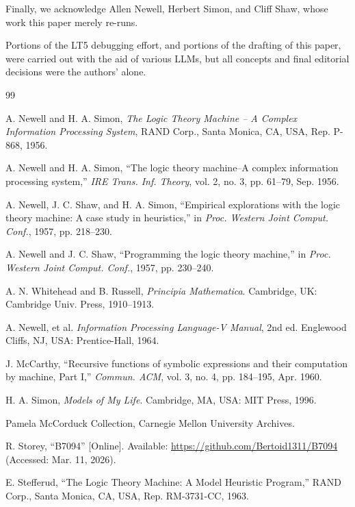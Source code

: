 \documentclass[journal]{IEEEtran}
\begin{document}
Finally, we acknowledge Allen Newell, Herbert Simon, and Cliff Shaw,
whose work this paper merely re-runs.

{\footnotesize Portions of the LT5 debugging effort, and portions of
the drafting of this paper, were carried out with the aid of various
LLMs, but all concepts and final editorial decisions were the
authors' alone.}

\begin{thebibliography}{99}

 A. Newell and H. A. Simon, \textit{The Logic Theory
  Machine -- A Complex Information Processing System}, RAND Corp.,
  Santa Monica, CA, USA, Rep. P-868, 1956.

 A. Newell and H. A. Simon, ``The logic theory
  machine--A complex information processing system,'' \textit{IRE
  Trans. Inf. Theory}, vol. 2, no. 3, pp. 61--79, Sep. 1956.

 A. Newell, J. C. Shaw, and H. A. Simon, ``Empirical
  explorations with the logic theory machine: A case study in
  heuristics,'' in \textit{Proc. Western Joint Comput. Conf.}, 1957,
  pp. 218--230.

 A. Newell and J. C. Shaw, ``Programming the
  logic theory machine,'' in \textit{Proc. Western Joint
  Comput. Conf.}, 1957, pp. 230--240.

 A. N. Whitehead and B. Russell,
  \textit{Principia Mathematica}. Cambridge, UK: Cambridge
  Univ. Press, 1910--1913.

 A. Newell, et al. \textit{Information
  Processing Language-V Manual}, 2nd ed. Englewood Cliffs, NJ, USA:
  Prentice-Hall, 1964.

 J. McCarthy, ``Recursive functions of
  symbolic expressions and their computation by machine, Part I,''
  \textit{Commun. ACM}, vol. 3, no. 4, pp. 184--195, Apr. 1960.

 H. A. Simon, \textit{Models of My Life}.
  Cambridge, MA, USA: MIT Press, 1996.

  Pamela McCorduck Collection, Carnegie Mellon University Archives.

 R. Storey, ``B7094'' [Online]. Available:
  \url{https://github.com/Bertoid1311/B7094} (Accessed: Mar. 11,
  2026).

 E. Stefferud, ``The Logic Theory Machine: A
  Model Heuristic Program,'' RAND Corp., Santa Monica, CA, USA,
  Rep. RM-3731-CC, 1963.


\end{thebibliography}
\end{document}
